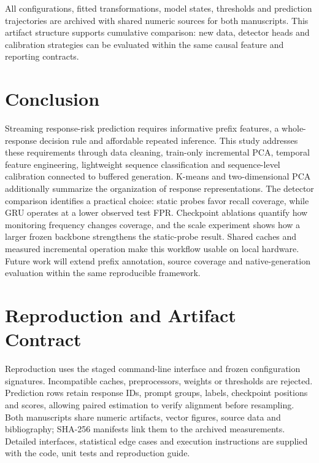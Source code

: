 All configurations, fitted transformations, model states, thresholds and prediction trajectories are archived with shared numeric sources for both manuscripts. This artifact structure supports cumulative comparison: new data, detector heads and calibration strategies can be evaluated within the same causal feature and reporting contracts.

\section{Conclusion}
Streaming response-risk prediction requires informative prefix features, a whole-response decision rule and affordable repeated inference. This study addresses these requirements through data cleaning, train-only incremental PCA, temporal feature engineering, lightweight sequence classification and sequence-level calibration connected to buffered generation. K-means and two-dimensional PCA additionally summarize the organization of response representations. \ReviewRankingEN{} The detector comparison identifies a practical choice: static probes favor recall coverage, while GRU operates at a lower observed test FPR. Checkpoint ablations quantify how monitoring frequency changes coverage, and the scale experiment shows how a larger frozen backbone strengthens the static-probe result. \AchievementScaleEN{} Shared caches and measured incremental operation make this workflow usable on local hardware. Future work will extend prefix annotation, source coverage and native-generation evaluation within the same reproducible framework.

\appendices
\section{Reproduction and Artifact Contract}
Reproduction uses the staged command-line interface and frozen configuration signatures. Incompatible caches, preprocessors, weights or thresholds are rejected. Prediction rows retain response IDs, prompt groups, labels, checkpoint positions and scores, allowing paired estimation to verify alignment before resampling. Both manuscripts share numeric artifacts, vector figures, source data and bibliography; SHA-256 manifests link them to the archived measurements. Detailed interfaces, statistical edge cases and execution instructions are supplied with the code, unit tests and reproduction guide.
